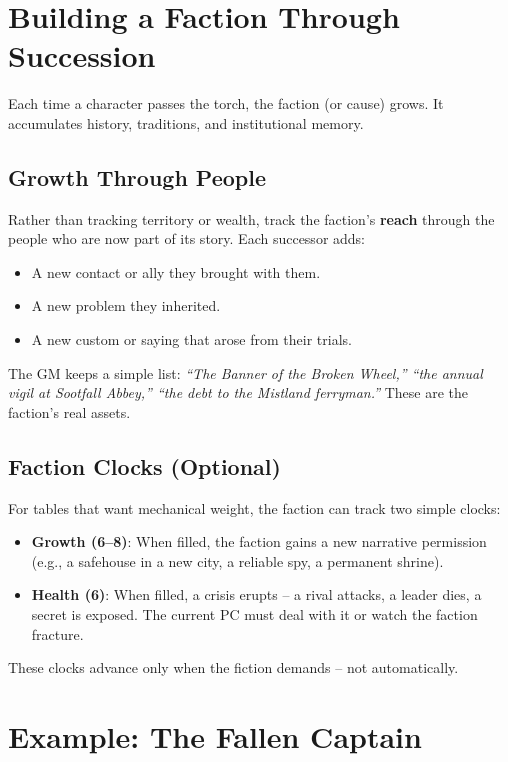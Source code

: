 \section{Building a Faction Through Succession}
\label{sec:faction-growth}

Each time a character passes the torch, the faction (or cause) grows. It accumulates history, traditions, and institutional memory.

\subsection{Growth Through People}
\label{subsec:faction-people}
Rather than tracking territory or wealth, track the faction’s \textbf{reach} through the people who are now part of its story. Each successor adds:
\begin{itemize}
  \item A new contact or ally they brought with them.
  \item A new problem they inherited.
  \item A new custom or saying that arose from their trials.
\end{itemize}
The GM keeps a simple list: \textit{“The Banner of the Broken Wheel,” “the annual vigil at Sootfall Abbey,” “the debt to the Mistland ferryman.”} These are the faction’s real assets.

\subsection{Faction Clocks (Optional)}
\label{subsec:faction-clocks}

For tables that want mechanical weight, the faction can track two simple clocks:
\begin{itemize}
  \item \textbf{Growth (6–8)}: When filled, the faction gains a new narrative permission (e.g., a safehouse in a new city, a reliable spy, a permanent shrine).
  \item \textbf{Health (6)}: When filled, a crisis erupts – a rival attacks, a leader dies, a secret is exposed. The current PC must deal with it or watch the faction fracture.
\end{itemize}
These clocks advance only when the fiction demands – not automatically.

\section{Example: The Fallen Captain}
\label{sec:example-fallen-captain}

